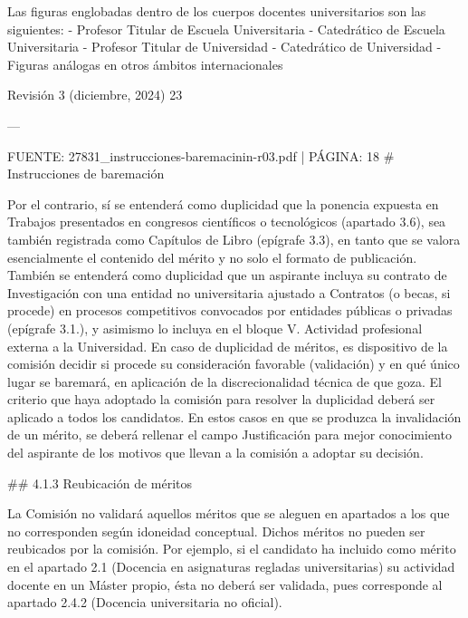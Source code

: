 \documentclass{article}
\begin{document}
\begin{itemize}
\begin{itemize}
\begin{scriptsize}
                  Las figuras englobadas dentro de los cuerpos docentes universitarios son las siguientes:
                  - Profesor Titular de Escuela Universitaria
                  - Catedrático de Escuela Universitaria
                  - Profesor Titular de Universidad
                  - Catedrático de Universidad
                  - Figuras análogas en otros ámbitos internacionales

                  Revisión 3 (diciembre, 2024) 23

                  ---

                  FUENTE: 27831\_instrucciones-baremacinin-r03.pdf | PÁGINA: 18
                  \# Instrucciones de baremación

                  Por el contrario, sí se entenderá como duplicidad que la ponencia expuesta en Trabajos presentados en congresos científicos o tecnológicos (apartado 3.6), sea también registrada como Capítulos de Libro (epígrafe 3.3), en tanto que se valora esencialmente el contenido del mérito y no solo el formato de publicación. También se entenderá como duplicidad que un aspirante incluya su contrato de Investigación con una entidad no universitaria ajustado a Contratos (o becas, si procede) en procesos competitivos convocados por entidades públicas o privadas (epígrafe 3.1.), y asimismo lo incluya en el bloque V. Actividad profesional externa a la Universidad. En caso de duplicidad de méritos, es dispositivo de la comisión decidir si procede su consideración favorable (validación) y en qué único lugar se baremará, en aplicación de la discrecionalidad técnica de que goza. El criterio que haya adoptado la comisión para resolver la duplicidad deberá ser aplicado a todos los candidatos. En estos casos en que se produzca la invalidación de un mérito, se deberá rellenar el campo Justificación para mejor conocimiento del aspirante de los motivos que llevan a la comisión a adoptar su decisión.

                  \#\# 4.1.3 Reubicación de méritos

                  La Comisión no validará aquellos méritos que se aleguen en apartados a los que no corresponden según idoneidad conceptual. Dichos méritos no pueden ser reubicados por la comisión. Por ejemplo, si el candidato ha incluido como mérito en el apartado 2.1 (Docencia en asignaturas regladas universitarias) su actividad docente en un Máster propio, ésta no deberá ser validada, pues corresponde al apartado 2.4.2 (Docencia universitaria no oficial).


\end{scriptsize}
\end{itemize}
\end{itemize}
\end{document}
